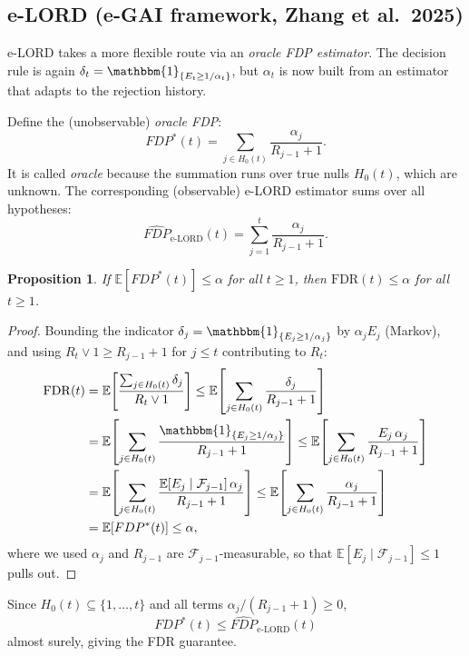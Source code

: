 \documentclass[11pt,a4paper]{article}
\theoremstyle{plain}
\newtheorem{proposition}[theorem]{Proposition}
\theoremstyle{definition}
\theoremstyle{remark}
\newcommand{\E}{\mathbb{E}}
\newcommand{\ind}{\mathbbm{1}}
\newcommand{\FDR}{\mathrm{FDR}}
\begin{document}
\subsection{e-LORD (e-GAI framework, Zhang et al.\ 2025)}
\label{sec:elord}

e-LORD takes a more flexible route via an \emph{oracle FDP estimator}. The
decision rule is again $\delta_t = \ind_{\{E_t \geq 1/\alpha_t\}}$, but
$\alpha_t$ is now built from an estimator that adapts to the rejection
history.

Define the (unobservable) \emph{oracle FDP}:
\[
  FDP^*(t) = \sum_{j \in H_0(t)} \frac{\alpha_j}{R_{j-1} + 1}.
\]
It is called \emph{oracle} because the summation runs over true nulls
$H_0(t)$, which are unknown. The corresponding (observable) e-LORD estimator
sums over all hypotheses:
\[
  \widehat{FDP}_{\text{e-LORD}}(t) = \sum_{j=1}^{t} \frac{\alpha_j}{R_{j-1} + 1}.
\]

\begin{proposition}\label{prop:oracle-fdr}
If $\E[FDP^*(t)] \leq \alpha$ for all $t \geq 1$, then $\FDR(t) \leq \alpha$
for all $t \geq 1$.
\end{proposition}

\begin{proof}
Bounding the indicator $\delta_j = \ind_{\{E_j \geq 1/\alpha_j\}}$ by
$\alpha_j E_j$ (Markov), and using $R_t \vee 1 \geq R_{j-1} + 1$ for
$j \leq t$ contributing to $R_t$:
\begin{align*}
\FDR(t) &= \E\!\left[\frac{\sum_{j \in H_0(t)} \delta_j}{R_t \vee 1}\right]
  \leq \E\!\left[\sum_{j \in H_0(t)} \frac{\delta_j}{R_{j-1}+1}\right]\\
  &= \E\!\left[\sum_{j \in H_0(t)} \frac{\ind_{\{E_j \geq 1/\alpha_j\}}}{R_{j-1}+1}\right]
  \leq \E\!\left[\sum_{j \in H_0(t)} \frac{E_j\,\alpha_j}{R_{j-1}+1}\right]\\
  &= \E\!\left[\sum_{j \in H_0(t)} \frac{\E[E_j \mid \mathcal{F}_{j-1}]\,\alpha_j}{R_{j-1}+1}\right]
  \leq \E\!\left[\sum_{j \in H_0(t)} \frac{\alpha_j}{R_{j-1}+1}\right]\\
  &= \E[FDP^*(t)] \leq \alpha,
\end{align*}
where we used $\alpha_j$ and $R_{j-1}$ are $\mathcal{F}_{j-1}$-measurable, so
that $\E[E_j \mid \mathcal{F}_{j-1}] \leq 1$ pulls out.
\end{proof}

Since $H_0(t) \subseteq \{1, \ldots, t\}$ and all terms $\alpha_j/(R_{j-1}+1)
\geq 0$,
\[
  FDP^*(t) \leq \widehat{FDP}_{\text{e-LORD}}(t)
\]
almost surely, giving the FDR guarantee.
\end{document}
